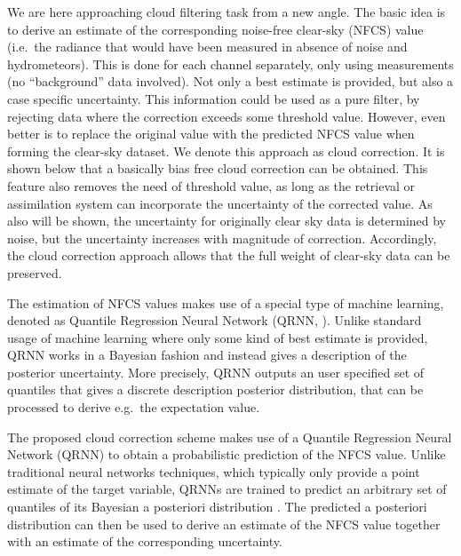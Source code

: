 \documentclass[amt, manuscript]{copernicus}
\begin{document}
We are here approaching cloud filtering task from a new angle. The basic idea
is to derive an estimate of the corresponding noise-free clear-sky (NFCS) value
(i.e.\ the radiance that would have been measured in absence of noise and
hydrometeors). This is done for each channel separately, only using
measurements (no ``background'' data involved). Not only a best estimate is
provided, but also a case specific uncertainty. This information could be used as a pure filter, by rejecting data where the correction exceeds some threshold value. However, even
better is to replace the original value with the predicted NFCS value when
forming the clear-sky dataset. We denote this approach as cloud correction. It
is shown below that a basically bias free cloud correction can be obtained.
This feature also removes the need of threshold value, as long as the retrieval or
assimilation system can incorporate the uncertainty of the corrected value. As
also will be shown, the uncertainty for originally clear sky data is determined
by noise, but the uncertainty increases with magnitude of correction.
Accordingly, the cloud correction approach allows that the full weight of
clear-sky data can be preserved.

The estimation of NFCS values makes use of a special type of machine learning,
denoted as Quantile Regression Neural Network (QRNN,
\citet{pfreundschuh:aneur:18}). Unlike standard usage of machine learning where
only some kind of best estimate is provided, QRNN works in a Bayesian fashion
and instead gives a description of the posterior uncertainty. More precisely,
QRNN outputs an user specified set of quantiles that gives a discrete
description posterior distribution, that can be processed to derive e.g.\ the
expectation value.

The proposed cloud correction scheme makes use of a Quantile Regression Neural
Network (QRNN) to obtain a probabilistic prediction of the NFCS value. Unlike
traditional neural networks techniques, which typically only provide a point
estimate of the target variable, QRNNs are trained to predict an arbitrary set
of quantiles of its Bayesian a posteriori distribution
\citep{pfreundschuh:aneur:18}. The predicted a posteriori distribution 
can then be used to derive an estimate of the NFCS value together with an estimate
of the corresponding uncertainty.
\end{document}
